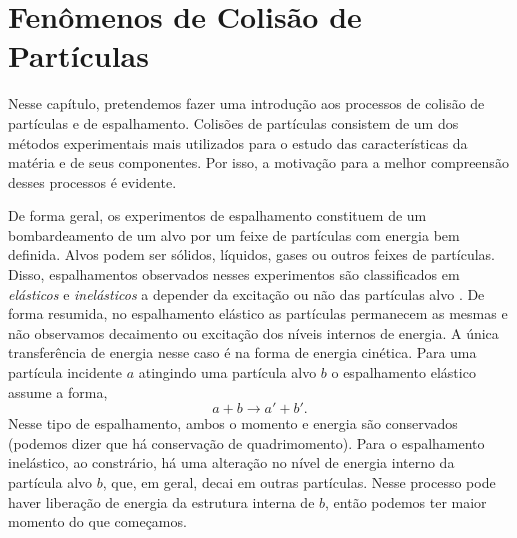 \chapter{Fenômenos de Colisão de Partículas}
Nesse capítulo, pretendemos fazer uma introdução aos processos de colisão de
partículas e de espalhamento. Colisões de partículas consistem de um dos
métodos experimentais mais utilizados para o estudo das características da
matéria e de seus componentes. Por isso, a motivação para a melhor compreensão
desses processos é evidente.

De forma geral, os experimentos de espalhamento constituem de um bombardeamento
de um alvo por um feixe de partículas com energia bem definida. Alvos podem ser
sólidos, líquidos, gases ou outros feixes de partículas. Disso, espalhamentos
observados nesses experimentos são classificados em \textit{elásticos} e
\textit{inelásticos} a depender da excitação ou não das partículas alvo
\cite{povh6ed}. De forma resumida, no espalhamento elástico as partículas
permanecem as mesmas e não observamos decaimento ou excitação dos níveis
internos de energia. A única transferência de energia nesse caso é na forma de
energia cinética. Para uma partícula incidente $a$ atingindo uma partícula alvo
$b$ o espalhamento elástico assume a forma,
\begin{equation}
	a + b \rightarrow a' + b' .
\end{equation}
Nesse tipo de espalhamento, ambos o momento e energia são conservados (podemos
dizer que há conservação de quadrimomento). Para o espalhamento inelástico, ao
constrário, há uma alteração no nível de energia interno da partícula alvo $b$,
que, em geral, decai em outras partículas. Nesse processo pode haver liberação
de energia da estrutura interna de $b$, então podemos ter maior momento do que
começamos.
\begin{figure}[h]
	\centering
	\captionsetup{width=10cm}
	\caption{Esquemas demonstrando colisão elástica $a + b \rightarrow a' +
	b'$, e inelástica $a + b \rightarrow a' + c + d$.}
	\begin{subfigure}[b]{3.25cm}
		\centering
		
	\end{subfigure}
	\hspace{1.5cm}
	\begin{subfigure}[b]{4.5cm}
		\centering
		
	\end{subfigure}
\end{figure}

